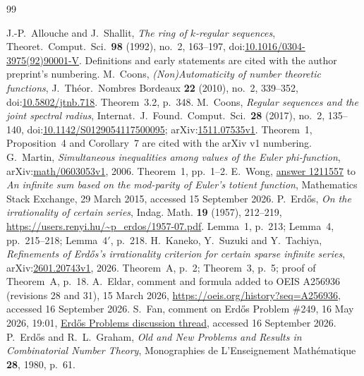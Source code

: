 \documentclass[11pt]{article}
\theoremstyle{plain}
\theoremstyle{definition}
\theoremstyle{remark}
\begin{document}
\clearpage
\begin{thebibliography}{99}
\small
\raggedright
\setlength{\itemsep}{0pt}
J.-P.~Allouche and J.~Shallit, \emph{The ring of $k$-regular sequences},
Theoret.\ Comput.\ Sci.\ \textbf{98} (1992), no.~2, 163--197,
doi:\href{https://doi.org/10.1016/0304-3975(92)90001-V}{10.1016/0304-3975(92)90001-V}.
Definitions and early statements are cited with the author preprint's numbering.
M.~Coons, \emph{(Non)Automaticity of number theoretic functions},
J.\ Th\'eor.\ Nombres Bordeaux \textbf{22} (2010), no.~2, 339--352,
doi:\href{https://doi.org/10.5802/jtnb.718}{10.5802/jtnb.718}.
Theorem~3.2, p.~348.
M.~Coons, \emph{Regular sequences and the joint spectral radius},
Internat.\ J.\ Found.\ Comput.\ Sci.\ \textbf{28} (2017), no.~2, 135--140,
doi:\href{https://doi.org/10.1142/S0129054117500095}{10.1142/S0129054117500095};
arXiv:\href{https://arxiv.org/abs/1511.07535v1}{1511.07535v1}.
Theorem~1, Proposition~4 and Corollary~7 are cited with the arXiv v1 numbering.
G.~Martin, \emph{Simultaneous inequalities among values of the Euler
phi-function}, arXiv:\href{https://arxiv.org/abs/math/0603053v1}{math/0603053v1}, 2006.
Theorem~1, pp.~1--2.
E.~Wong, \href{https://math.stackexchange.com/a/1211557}{answer 1211557} to
\emph{An infinite sum based on the mod-parity of Euler's totient function},
Mathematics Stack Exchange, 29 March 2015, accessed 15 September 2026.
P.~Erd\H{o}s, \emph{On the irrationality of certain series}, Indag. Math.
\textbf{19} (1957), 212--219,
\url{https://users.renyi.hu/~p_erdos/1957-07.pdf}.
Lemma~1, p.~213; Lemma~4, pp.~215--218; Lemma~4$'$, p.~218.
H.~Kaneko, Y.~Suzuki and Y.~Tachiya, \emph{Refinements of Erd\H{o}s's
irrationality criterion for certain sparse infinite series},
arXiv:\href{https://arxiv.org/abs/2601.20743v1}{2601.20743v1}, 2026.
Theorem~A, p.~2; Theorem~3, p.~5; proof of Theorem~A, p.~18.
A.~Eldar, comment and formula added to OEIS A256936 (revisions 28 and 31),
15 March 2026, \url{https://oeis.org/history?seq=A256936},
accessed 16 September 2026.
S.~Fan, comment on Erd\H{o}s Problem \#249, 16 May 2026, 19:01,
\href{https://www.erdosproblems.com/forum/thread/249}{Erd\H{o}s Problems
discussion thread}, accessed 16 September 2026.
P.~Erd\H{o}s and R.~L.~Graham, \emph{Old and New Problems and Results in
Combinatorial Number Theory}, Monographies de L'Enseignement
Math\'ematique \textbf{28}, 1980, p.~61.

\end{thebibliography}
\end{document}
